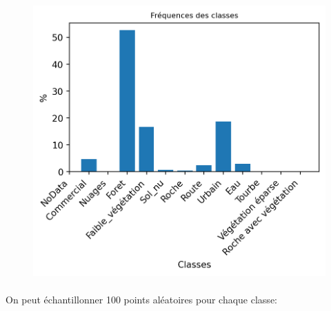 \documentclass[
]{article}
\begin{document}
\begin{figure}
\centering
\includegraphics[width=4.54167in,height=4.19792in]{05-ClassificationsSupervisees_files/figure-html/cell-10-output-1.png}
\caption{}
\end{figure}

On peut échantillonner 100 points aléatoires pour chaque classe:
\end{document}
